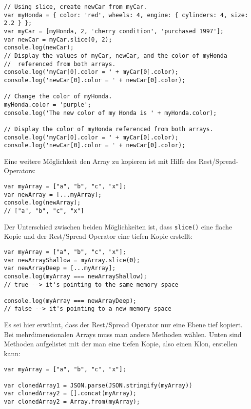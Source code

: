 \documentclass{book}
\begin{document}
\begin{lstlisting}[caption=Array Konstruktor]
// Using slice, create newCar from myCar.
var myHonda = { color: 'red', wheels: 4, engine: { cylinders: 4, size: 2.2 } };
var myCar = [myHonda, 2, 'cherry condition', 'purchased 1997'];
var newCar = myCar.slice(0, 2);
console.log(newCar);
// Display the values of myCar, newCar, and the color of myHonda
//  referenced from both arrays.
console.log('myCar[0].color = ' + myCar[0].color);
console.log('newCar[0].color = ' + newCar[0].color);

// Change the color of myHonda.
myHonda.color = 'purple';
console.log('The new color of my Honda is ' + myHonda.color);

// Display the color of myHonda referenced from both arrays.
console.log('myCar[0].color = ' + myCar[0].color);
console.log('newCar[0].color = ' + newCar[0].color);
\end{lstlisting}

Eine weitere Möglichkeit den Array zu kopieren ist mit Hilfe des Rest/Spread-Operators:
\begin{lstlisting}[caption=Array Konstruktor]
var myArray = ["a", "b", "c", "x"];
var newArray = [...myArray];
console.log(newArray);
// ["a", "b", "c", "x"]
\end{lstlisting}

Der Unterschied zwischen beiden Möglichkeiten ist, dass \lstinline|slice()| eine flache Kopie und der Rest/Spread Operator eine tiefen Kopie erstellt:

\begin{lstlisting}[caption=Array Konstruktor]
var myArray = ["a", "b", "c", "x"];
var newArrayShallow = myArray.slice(0);
var newArrayDeep = [...myArray];
console.log(myArray === newArrayShallow);
// true --> it's pointing to the same memory space

console.log(myArray === newArrayDeep);
// false --> it's pointing to a new memory space
\end{lstlisting}

Es sei hier erwähnt, dass der Rest/Spread Operator nur eine Ebene tief kopiert. Bei mehrdimensionalen Arrays muss man andere Methoden wählen. Unten sind Methoden aufgelistet mit der man eine tiefen Kopie, also einen Klon, erstellen kann:

\begin{lstlisting}[caption=Array Konstruktor]
var myArray = ["a", "b", "c", "x"];

var clonedArray1 = JSON.parse(JSON.stringify(myArray))
var clonedArray2 = [].concat(myArray);
var clonedArray2 = Array.from(myArray);
\end{lstlisting}
\end{document}
